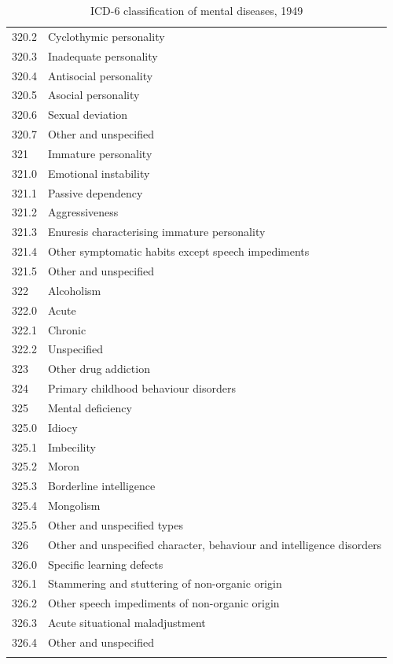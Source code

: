 \begin{longtable}[!t]{ | p{2cm} | p{11.8cm} | }
320.2&     Cyclothymic personality\\
320.3&     Inadequate personality\\
320.4&     Antisocial personality\\
320.5&     Asocial personality\\
320.6&     Sexual deviation\\
320.7&     Other and unspecified\\
321&Immature personality\\
321.0&     Emotional instability\\
321.1&     Passive dependency\\
321.2&     Aggressiveness\\
321.3&     Enuresis characterising immature personality\\
321.4&     Other symptomatic habits except speech impediments\\
321.5&     Other and unspecified\\
322&Alcoholism\\
322.0&     Acute\\
322.1&     Chronic\\
322.2&     Unspecified\\
323&Other drug addiction\\
324&Primary childhood behaviour disorders\\
325&Mental deficiency\\
325.0&     Idiocy\\
325.1&     Imbecility\\
325.2&     Moron\\
325.3&     Borderline intelligence\\
325.4&     Mongolism\\
325.5&     Other and unspecified types\\
326&Other and unspecified character, behaviour and intelligence disorders\\
326.0&     Specific learning defects\\
326.1&     Stammering and stuttering of non-organic origin\\
326.2&     Other speech impediments of non-organic origin\\
326.3&     Acute situational maladjustment\\
326.4&     Other and unspecified\\ \hline
\caption{ICD-6 classification of mental diseases, 1949}
\label{table: 1949Classification}
\end{longtable}


